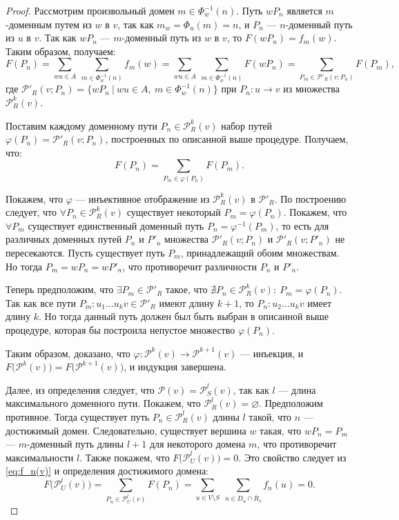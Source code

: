 \documentclass[../thesis.tex]{subfiles}
\begin{document}
\begin{proof}
Рассмотрим произвольный домен $m\in \Phi^{-1}_w(n)$.
Путь $wP_n$ является $m$-\linebreak доменным путем из $w$ в $v$, так как $m_w = \Phi_u(m) = n$, и $P_n$ --- $n$-доменный путь из $u$ в $v$.
Так как $wP_n$ --- $m$-доменный путь из $w$ в $v$, то $F(wP_n) = f_m(w)$.
Таким образом, получаем:
\begin{equation}
    F(P_n) = \sum_{wu\in A}{\ \sum_{m\in \Phi^{-1}_w(n)}{f_m(w)} } = \sum_{wu\in A}{\ \sum_{m\in \Phi^{-1}_w(n)}{F(wP_n)} } = \sum_{P_m\in \mathcal{P}'_R(v; P_n)}{F(P_m)},
\end{equation}
где $\mathcal{P}'_R(v; P_n) = \{ wP_n\ |\ wu\in A,\ m\in \Phi^{-1}_w(n) \}$ при $P_n:u\rightarrow v$ из множества $\mathcal{P}^{k}_R(v)$.

Поставим каждому доменному пути $P_n\in \mathcal{P}^k_R(v)$ набор путей $\varphi(P_n) = \mathcal{P}'_R(v; P_n)$, построенных по описанной выше процедуре. Получаем, что:
\begin{equation}
    F(P_n) = \sum_{P_m\in \varphi(P_n)}{F(P_m)}.
\end{equation}

Покажем, что $\varphi$ --- инъективное отображение из $\mathcal{P}^k_R(v)$ в $\mathcal{P}'_R$.
По построению следует, что $\forall P_n\in \mathcal{P}^k_R(v)$ существует некоторый $P_m = \varphi(P_n)$.
Покажем, что $\forall P_m$ существует единственный доменный путь $P_n = \varphi^{-1}(P_m)$, то есть для различных доменных путей $P_n$ и $P'_n$ множества $\mathcal{P}'_R(v; P_n)$ и $\mathcal{P}'_R(v; P'_n)$ не пересекаются.
Пусть существует путь $P_m$, принадлежащий обоим множествам. Но тогда $P_m = wP_n = wP'_n$, что противоречит различности $P_n$ и $P'_n$.

Теперь предположим, что $\exists P_m\in \mathcal{P}'_R$ такое, что $\nexists P_n\in \mathcal{P}^k_R(v):\ P_m = \varphi(P_n)$.
Так как все пути $P_m:u_1\dots u_kv\in \mathcal{P}'_R$ имеют длину $k+1$, то $P_n:u_2\dots u_kv$ имеет длину $k$.
Но тогда данный путь должен был быть выбран в описанной выше процедуре, которая бы построила непустое множество $\varphi(P_n)$.

Таким образом, доказано, что $\varphi: \mathcal{P}^{k}(v)\rightarrow \mathcal{P}^{k+1}(v)$ --- инъекция, и $F\big(\mathcal{P}^{k}(v)\big) = F\big(\mathcal{P}^{k+1}(v)\big)$, и индукция завершена.

Далее, из определения следует, что $\mathcal{P}(v) = \mathcal{P}^l_S(v)$, так как $l$ --- длина максимального доменного пути.
Покажем, что $\mathcal{P}^l_R(v) = \varnothing$.
Предположим противное.
Тогда существует путь $P_n\in \mathcal{P}^l_R(v)$ длины $l$ такой, что $n$ --- достижимый домен.
Следовательно, существует вершина $w$ такая, что $wP_n = P_m$ --- $m$-доменный путь длины $l+1$ для некоторого домена $m$, что противоречит максимальности $l$.
Также покажем, что $F\big(\mathcal{P}^l_U(v)\big) = 0$.
Это свойство следует из \eqref{eq:f_n(v)} и определения достижимого домена:
\begin{equation}
    F\big(\mathcal{P}^l_U(v)\big) = \sum_{P_n\in \mathcal{P}^l_U(v)} {F(P_n)} = \sum_{u\in V\setminus S} {\ \sum_{n\in D_u\cap\overline{R}_v} {f_n(u)}} = 0.
\end{equation}


\end{proof}
\end{document}
